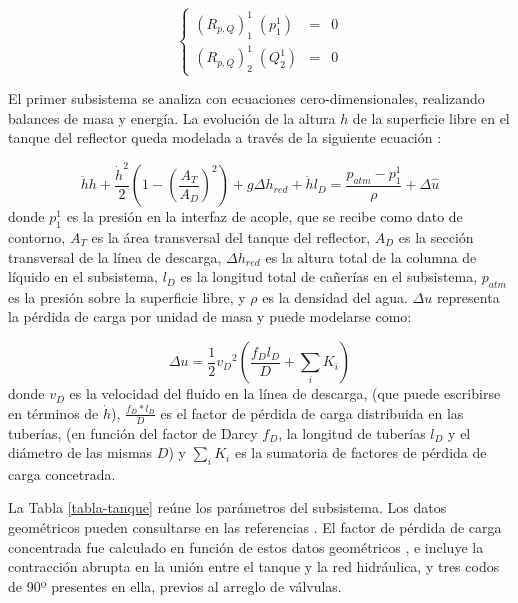 \begin{equation}
\left\{ \begin{array}{rcl}
(R_{p,Q})_{1}^{1}  \;(p_1^1) &=& 0 \\
(R_{p,Q})_{2}^{1}  \;(Q_2^1) &=& 0
\end{array}
\right.
\end{equation}

El primer subsistema se analiza con ecuaciones cero-dimensionales,
realizando balances de masa y energía.
La evolución de la altura $h$ de la superficie libre en el tanque del reflector
queda modelada a través de la siguiente ecuación \cite{bird}:

\begin{equation}
\ddot{h} h + \frac{\dot{h}^2}{2}\left( 1- \left(\frac{A_T}{A_D} \right)^2 \right) + g \Delta h_{red} + \ddot{h}  l_D = 
\frac{p_{atm}-p_1^1}{\rho} + \Delta \hat{u}
\label{eq-tanque}
\end{equation}
donde $p_1^1$ es la presión en la interfaz de acople,
que se recibe como dato de contorno,
$A_T$ es la área transversal del tanque del reflector, 
$A_D$ es la sección transversal de la línea de descarga,
$\Delta h_{red}$ es la altura total de la columna de líquido en el subsistema,
$l_D$ es la longitud total de cañerías en el subsistema,
$p_{atm}$ es la presión sobre la superficie libre,
y $\rho$ es la densidad del agua.
$\Delta u$ representa la pérdida de carga por unidad de masa y puede modelarse como:

\begin{equation}
\Delta u = \frac {1} {2} {v_D}^2 \left( \frac {f_D l_D}{D} + \sum_i K_i \right)
\end{equation}
donde $v_D$ es la velocidad del fluido en la línea de descarga,
(que puede escribirse en términos de $\dot{h}$),
$\frac {f_D*l_D}{D}$ es el factor de pérdida de carga distribuida en las tuberías,
(en función del factor de Darcy $f_D$, la longitud de tuberías $l_D$ y el diámetro de las mismas $D$)
y $\sum_i K_i$ es la sumatoria de factores de pérdida de carga concetrada.

La Tabla \ref{tabla-tanque} reúne los parámetros del subsistema.
Los datos geométricos pueden consultarse en las referencias \cite{invap-mockup}.
El factor de pérdida de carga concentrada fue calculado en función de estos datos geométricos \cite{iedelchik},
e incluye la contracción abrupta en la unión entre el tanque y la red hidráulica,
y tres codos de 90º presentes en ella, previos al arreglo de válvulas.

